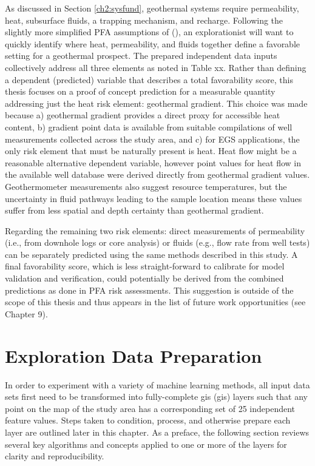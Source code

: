 As discussed in Section \ref{ch2:sysfund}, geothermal systems require permeability, heat, subsurface fluids, a trapping mechanism, and recharge. Following the slightly more simplified PFA assumptions of \citeauthor{bielicki_hydrogeolgic_2015} (\citeyear{bielicki_hydrogeolgic_2015}), an explorationist will want to quickly identify where heat, permeability, and fluids together define a favorable setting for a geothermal prospect. The prepared independent data inputs collectively address all three elements as noted in Table xx. Rather than defining a dependent (predicted) variable that describes a total favorability score, this thesis focuses on a proof of concept prediction for a measurable quantity addressing just the heat risk element: geothermal gradient. This choice was made because a) geothermal gradient provides a direct proxy for accessible heat content, b) gradient point data is available from suitable compilations of well measurements collected across the study area, and c) for EGS applications, the only risk element that must be naturally present is heat. Heat flow might be a reasonable alternative dependent variable, however point values for heat flow in the available well database were derived directly from geothermal gradient values. Geothermometer measurements also suggest resource temperatures, but the uncertainty in fluid pathways leading to the sample location means these values suffer from less spatial and depth certainty than geothermal gradient.

Regarding the remaining two risk elements: direct measurements of permeability (i.e., from downhole logs or core analysis) or fluids (e.g., flow rate from well tests) can be separately predicted using the same methods described in this study. A final favorability score, which is less straight-forward to calibrate for model validation and verification, could potentially be derived from the combined predictions as done in PFA risk assessments. This suggestion is outside of the scope of this thesis and thus appears in the list of future work opportunities (see Chapter 9).

\section{Exploration Data Preparation}

In order to experiment with a variety of machine learning methods, all input data sets first need to be transformed into fully-complete \acrlong{gis} (\acrshort{gis}) layers such that any point on the map of the study area has a corresponding set of 25 independent feature values. Steps taken to condition, process, and otherwise prepare each layer are outlined later in this chapter. As a preface, the following section reviews several key algorithms and concepts applied to one or more of the layers for clarity and reproducibility.


